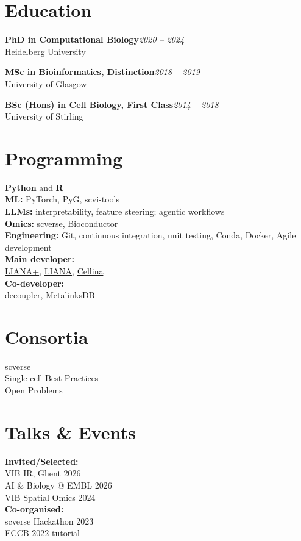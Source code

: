 \documentclass[11pt,a4paper]{article}
\newcommand{\cvrole}[3]{%
  {\bfseries #1}\hfill{\color{softgrey}\itshape #3}\\
  {\color{softgrey}#2}\par\vspace{3pt}}
\newcommand{\pkg}[2]{\href{#2}{\color{accent}#1}}
\begin{document}
\begin{paracol}{2}
\section{Education}

\cvrole{PhD in Computational Biology}{Heidelberg University}{2020 -- 2024}
\vspace{4pt}
\cvrole{MSc in Bioinformatics, Distinction}{University of Glasgow}{2018 -- 2019}
\vspace{4pt}
\cvrole{BSc (Hons) in Cell Biology, First Class}{University of Stirling}{2014 -- 2018}

\switchcolumn
\raggedright

\section{Programming}
\textbf{Python} and \textbf{R}\\[4pt]
\textbf{ML:} PyTorch, PyG, scvi-tools\\[4pt]
\textbf{LLMs:} interpretability, feature steering; agentic workflows\\[4pt]
\textbf{Omics:} scverse, Bioconductor\\[4pt]
\textbf{Engineering:} Git, continuous integration, unit testing, Conda, Docker, Agile development\\[4pt]
\textbf{Main developer:}\\
\pkg{LIANA+}{https://github.com/scverse/liana-py},
\pkg{LIANA}{https://github.com/saezlab/liana},
\pkg{Cellina}{https://github.com/PMBio/cellina}\\[4pt]
\textbf{Co-developer:}\\
\pkg{decoupler}{https://github.com/saezlab/decoupler-py},
\pkg{MetalinksDB}{https://metalinks.omnipathdb.org/}

\section{Consortia}
scverse\\[4pt]
Single-cell Best Practices\\[4pt]
Open Problems

\section{Talks \& Events}
\textbf{Invited/Selected:}\\
VIB IR, Ghent 2026\\[4pt]
AI \& Biology @ EMBL 2026\\[4pt]
VIB Spatial Omics 2024\\[5pt]
\textbf{Co-organised:}\\
scverse Hackathon 2023\\[4pt]
ECCB 2022 tutorial


\end{paracol}
\end{document}
